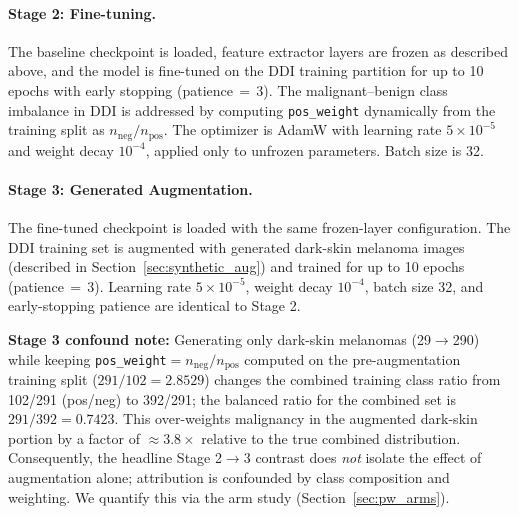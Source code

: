 \paragraph{Stage 2: Fine-tuning.}
The baseline checkpoint is loaded, feature extractor layers are frozen as described above, and the model is fine-tuned on the DDI training partition for up to 10 epochs with early stopping (patience\,$=$\,3). The malignant--benign class imbalance in DDI is addressed by computing \texttt{pos\_weight} dynamically from the training split as $n_{\text{neg}} / n_{\text{pos}}$. The optimizer is AdamW with learning rate $5 \times 10^{-5}$ and weight decay $10^{-4}$, applied only to unfrozen parameters. Batch size is 32.

\paragraph{Stage 3: Generated Augmentation.}
The fine-tuned checkpoint is loaded with the same frozen-layer configuration. The DDI training set is augmented with generated dark-skin melanoma images (described in Section~\ref{sec:synthetic_aug}) and trained for up to 10 epochs (patience\,$=$\,3). Learning rate $5 \times 10^{-5}$, weight decay $10^{-4}$, batch size 32, and early-stopping patience are identical to Stage 2.

\textbf{Stage 3 confound note:} Generating only dark-skin melanomas (29$\to$290) while keeping \texttt{pos\_weight}$= n_{\text{neg}}/n_{\text{pos}}$ computed on the pre-augmentation training split ($291/102=2.8529$) changes the combined training class ratio from 102/291 (pos/neg) to 392/291; the balanced ratio for the combined set is $291/392=0.7423$. This over-weights malignancy in the augmented dark-skin portion by a factor of $\approx 3.8\times$ relative to the true combined distribution. Consequently, the headline Stage 2$\to$3 contrast does \emph{not} isolate the effect of augmentation alone; attribution is confounded by class composition and weighting. We quantify this via the arm study (Section~\ref{sec:pw_arms}).


